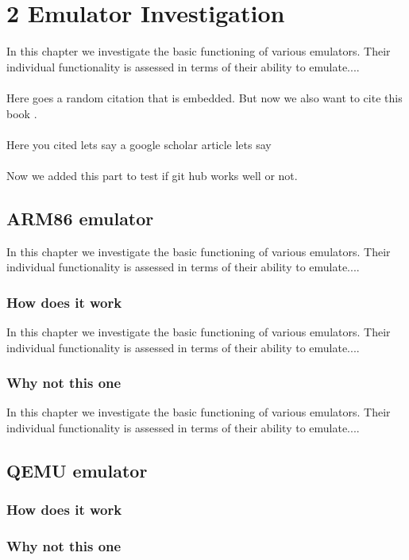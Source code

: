 \chapter*{2 Emulator Investigation}
\setcounter{chapter}{2}
\label{emul}
In this chapter we investigate the basic functioning of various emulators. Their individual functionality is assessed in terms of their ability to emulate....
\\\\
Here goes a random citation \cite{Sweigart2015} that is embedded. But now we also want to cite this book  \cite{Romero}.
\\\\
Here you cited lets say a google scholar article lets say \cite{Hashim}
\\\\
Now we added this part to test if git hub works well or not.

\section{ARM86 emulator}
In this chapter we investigate the basic functioning of various emulators. Their individual functionality is assessed in terms of their ability to emulate....
\label{ARM86emu}

	\subsection{How does it work}
	In this chapter we investigate the basic functioning of 		various emulators. Their individual functionality is 			assessed in terms of their ability to emulate....
	
	\subsection{Why not this one}
	In this chapter we investigate the basic functioning of 		various emulators. Their individual functionality is 			assessed in terms of their ability to emulate....

\section{QEMU emulator}
\label{QEMUemu}

	\subsection{How does it work}
	\subsection{Why not this one}





